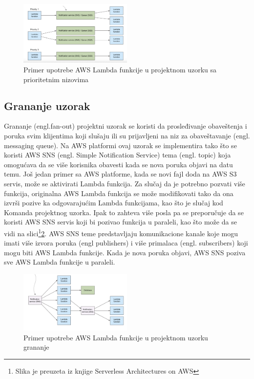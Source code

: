 \documentclass[12pt,oneside]{memoir}
\begin{document}
\begin{figure}[!ht]
  \centering
  \includegraphics[width=0.5\textwidth]{Slika 14.png}
  \caption{Primer upotrebe AWS Lambda funkcije u projektnom uzorku sa prioritetnim nizovima}
  \label{fig:nizovi}
\end{figure}
 
\subsection{Grananje uzorak} %
Grananje (engl.fan-out) projektni uzorak se koristi da prosleđivanje obaveštenja i poruka svim klijentima koji slušaju ili su prijavljeni na niz za obaveštavanje (engl. messaging queue). Na AWS platformi ovaj uzorak se implementira tako što se koristi AWS SNS (engl. Simple Notification Service) tema (engl. topic) koja omogućava da se više korisnika obavesti kada se nova poruka objavi na datu temu. Još jedan primer sa AWS platforme, kada se novi fajl doda na AWS S3 servis, može se aktivirati Lambda funkcija. Za slučaj da je potrebno pozvati više funkcija, originalna AWS Lambda funkcija se može modifikovati tako da ona izvrši pozive ka odgovarajućim Lambda funkcijama, kao što je slučaj kod Komanda projektnog uzorka. Ipak to zahteva više posla pa se preporučuje da se koristi AWS SNS servis koji bi pozivao funkcija u paraleli, kao što može da se vidi na slici\footnote{Slika je preuzeta iz knjige Serverless Architectures on AWS}\ref{fig:grananje}. AWS SNS teme predstavljaju komunikacione kanale koje mogu imati više izvora poruka (engl publishers) i više primalaca (engl. subscribers) koji mogu biti AWS Lambda funkcije. Kada je nova poruka objavi, AWS SNS poziva sve AWS Lambda funkcije u paraleli.

\begin{figure}[!ht]
  \centering
  \includegraphics[width=0.5\textwidth]{Slika 15.png}
  \caption{Primer upotrebe AWS Lambda funkcije u projektnom uzorku grananje}
  \label{fig:grananje}
\end{figure}
\end{document}
